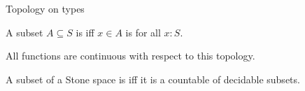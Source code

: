 \documentclass{beamer}
\begin{document}
\begin{frame}{Topology on types}
\begin{definition}
  A subset $A\subseteq S$ is 
  \only<-1>{closed}\only<2->{open}
  iff $x\in A$ is 
  for all $x:S$. 
\end{definition}
\pause
\pause
\begin{corollary}
  All functions are continuous with respect to this topology.
\end{corollary}
\pause 
\begin{lemma}
  A subset of a Stone space is 
  iff 
  it is a countable  of decidable subsets.
\end{lemma}
\end{frame}
\end{document}
